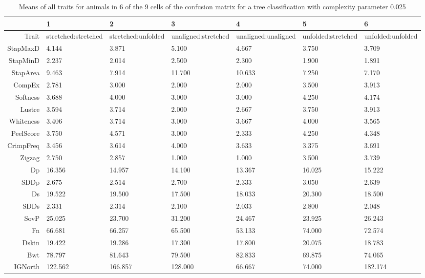 
\begin{landscape}
\begin{table}[ht]
\centering
\caption{Means of all traits for animals in 6 of the 9 cells of the confusion matrix for a tree classification with complexity parameter 0.025}
\label{tab:misc025means}
\begin{tabular}{rllllll}
  \hline
 & 1 & 2 & 3 & 4 & 5 & 6 \\ 
  \hline
Trait & stretched:stretched & stretched:unfolded & unaligned:stretched & unaligned:unaligned & unfolded:stretched & unfolded:unfolded \\ 
  StapMaxD & 4.144 & 3.871 & 5.100 & 4.667 & 3.750 & 3.709 \\ 
  StapMinD & 2.237 & 2.014 & 2.500 & 2.300 & 1.900 & 1.891 \\ 
  StapArea &  9.463 &  7.914 & 11.700 & 10.633 &  7.250 &  7.170 \\ 
  CompEx & 2.781 & 3.000 & 2.000 & 2.000 & 3.500 & 3.913 \\ 
  Softness & 3.688 & 4.000 & 3.000 & 3.000 & 4.250 & 4.174 \\ 
  Lustre & 3.594 & 3.714 & 2.000 & 2.667 & 3.750 & 3.913 \\ 
  Whiteness & 3.406 & 3.714 & 3.000 & 3.667 & 4.000 & 3.565 \\ 
  PeelScore & 3.750 & 4.571 & 3.000 & 2.333 & 4.250 & 4.348 \\ 
  CrimpFreq & 3.456 & 3.614 & 4.000 & 3.633 & 3.375 & 3.691 \\ 
  Zigzag & 2.750 & 2.857 & 1.000 & 1.000 & 3.500 & 3.739 \\ 
  Dp & 16.356 & 14.957 & 14.100 & 13.367 & 16.025 & 15.222 \\ 
  SDDp & 2.675 & 2.514 & 2.700 & 2.333 & 3.050 & 2.639 \\ 
  Ds & 19.522 & 19.500 & 17.500 & 18.033 & 20.300 & 18.500 \\ 
  SDDs & 2.331 & 2.314 & 2.100 & 2.033 & 2.800 & 2.048 \\ 
  SovP & 25.025 & 23.700 & 31.200 & 24.467 & 23.925 & 26.243 \\ 
  Fn & 66.681 & 66.257 & 65.500 & 53.133 & 74.000 & 72.574 \\ 
  Dskin & 19.422 & 19.286 & 17.300 & 17.800 & 20.075 & 18.783 \\ 
  Bwt & 78.797 & 81.643 & 79.500 & 82.833 & 69.875 & 74.065 \\ 
  IGNorth & 122.562 & 166.857 & 128.000 &  66.667 &  74.000 & 182.174 \\ 

\end{tabular}
\end{table}
\end{landscape}
